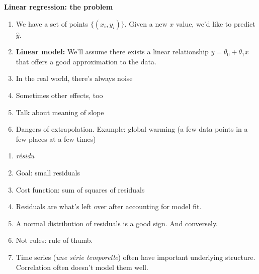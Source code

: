 




\textbf{Linear regression: the problem}
\begin{enumerate}
\item {} We have a set of points $\{(x_i, y_i)\}$.
  Given a new $x$ value, we'd like to predict $\hat y$.
\item \textbf{Linear model:} We'll assume there exists a linear
  relationship $y=\theta_0 + \theta_1 x$ that offers a good
  approximation to the data.
\item In the real world, there's always noise
\item Sometimes other effects, too
\item Talk about meaning of slope
\item Dangers of extrapolation.  Example: global warming (a few data
  points in a few places at a few times)
\end{enumerate}

\begin{enumerate}
\item \textit{résidu}
\item Goal: small residuals
\item Cost function: sum of squares of residuals
\item Residuals are what's left over after accounting for model fit.
\item A normal distribution of residuals is a good sign.  And
  conversely.
\item Not rules: rule of thumb.
\item Time series (\textit{une série temporelle}) often have important underlying structure.
  Correlation often doesn't model them well.
\end{enumerate}

